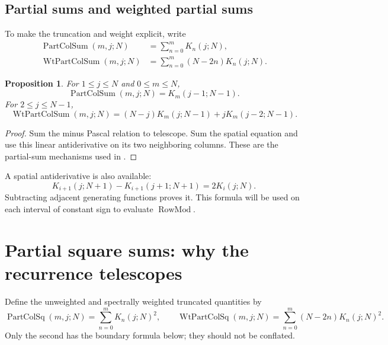 \documentclass[11pt,reqno]{amsart}
\newtheorem{proposition}[theorem]{Proposition}
\theoremstyle{remark}\newtheorem{remark}[theorem]{Remark}
\DeclareMathOperator{\RowMod}{RowMod}
\DeclareMathOperator{\PartColSum}{PartColSum}
\DeclareMathOperator{\PartColSq}{PartColSq}
\DeclareMathOperator{\WtPartColSum}{WtPartColSum}
\DeclareMathOperator{\WtPartColSq}{WtPartColSq}
\begin{document}
\subsection{Partial sums and weighted partial sums}
To make the truncation and weight explicit, write
\begin{align*}
\PartColSum(m,j;N)&=\sum_{n=0}^m K_n(j;N),\\
\WtPartColSum(m,j;N)&=\sum_{n=0}^m (N-2n)K_n(j;N).
\end{align*}
\begin{proposition}\label{linear}
For $1\le j\le N$ and $0\le m\le N$,
\begin{equation}\label{colpartial}
\PartColSum(m,j;N)=K_m(j-1;N-1).
\end{equation}
For $2\le j\le N-1$,
\begin{equation}\label{weightedlinear}
\WtPartColSum(m,j;N)=(N-j)K_m(j;N-1)+jK_m(j-2;N-1).
\end{equation}
\end{proposition}
\begin{proof}
Sum the minus Pascal relation to telescope. Sum the spatial equation and use this linear antiderivative on its two neighboring columns. These are the partial-sum mechanisms used in \cite{Feinsilver2016}.
\end{proof}
A spatial antiderivative is also available:
\begin{equation}\label{rowprimitive}
K_{i+1}(j;N+1)-K_{i+1}(j+1;N+1)=2K_i(j;N).
\end{equation}
Subtracting adjacent generating functions proves it. This formula will be used on each interval of constant sign to evaluate $\RowMod$.

\section{Partial square sums: why the recurrence telescopes}
Define the unweighted and spectrally weighted truncated quantities by
\[
\PartColSq(m,j;N)=\sum_{n=0}^m K_n(j;N)^2,\qquad
\WtPartColSq(m,j;N)=\sum_{n=0}^m(N-2n)K_n(j;N)^2.
\]
Only the second has the boundary formula below; they should not be conflated.
\end{document}
